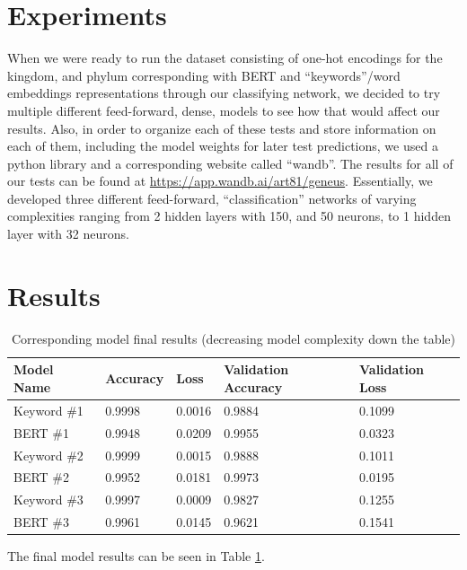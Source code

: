\documentclass[10pt,twocolumn,letterpaper]{article}
\begin{document}
\section{Experiments}

    When we were ready to run the dataset consisting of one-hot encodings for the kingdom, and phylum corresponding with BERT and “keywords”/word embeddings representations through our classifying network, we decided to try multiple different feed-forward, dense, models to see how that would affect our results. Also, in order to organize each of these tests and store information on each of them, including the model weights for later test predictions, we used a python library and a corresponding website called “wandb”. The results for all of our tests can be found at \href{https://app.wandb.ai/art81/geneus}{https://app.wandb.ai/art81/geneus}. Essentially, we developed three different feed-forward, “classification” networks of varying complexities ranging from 2 hidden layers with 150, and 50 neurons, to 1 hidden layer with 32 neurons.

\section{Results}

\begin{table}[]
    \centering
    \begin{tabular}{|l|l|p{1cm}|p{1.5cm}|p{1.5cm}|}
    \hline
    \bfseries Model Name &
    \bfseries Accuracy &
    \bfseries Loss &
    \bfseries Validation Accuracy &
    \bfseries Validation Loss \\ \hline
Keyword \#1 &
0.9998 &
0.0016 &
0.9884 &
0.1099 \\ \hline
BERT \#1 &
0.9948 &
0.0209 &
0.9955 &
0.0323 \\ \hline
Keyword \#2 &
0.9999 &
0.0015 &
0.9888 &
0.1011 \\ \hline
BERT \#2 &
0.9952 &
0.0181 &
0.9973 &
0.0195 \\ \hline
Keyword \#3 &
0.9997 &
0.0009 &
0.9827 &
0.1255 \\ \hline
BERT \#3 &
0.9961 &
0.0145 &
0.9621 &
0.1541 \\ \hline
    \end{tabular}
    \caption{Corresponding model final results (decreasing model complexity down the table)}
    \label{fig:results}
\end{table}

The final model results can be seen in Table \ref{fig:results}.
\end{document}
